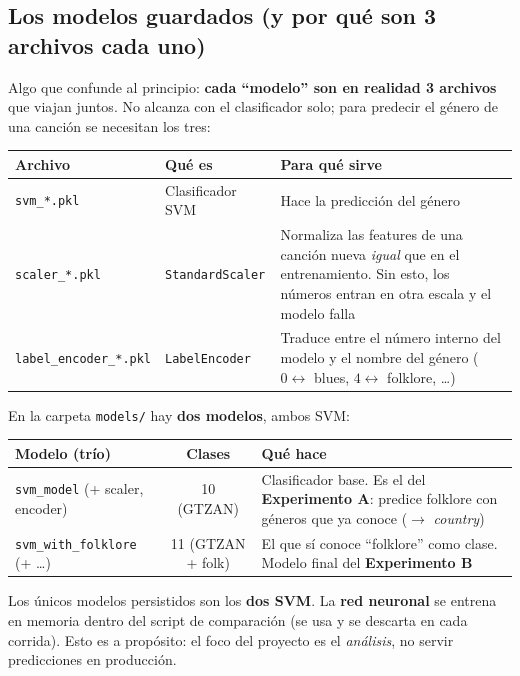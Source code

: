 \documentclass[11pt,a4paper]{article}
\newenvironment{defenbox}[1]{\begin{mdframed}[style=defenstyle,frametitle={#1}]}{\end{mdframed}}
\begin{document}
\subsection{Los modelos guardados (y por qué son 3 archivos cada uno)}

Algo que confunde al principio: \textbf{cada ``modelo'' son en realidad 3
archivos} que viajan juntos. No alcanza con el clasificador solo; para predecir
el género de una canción se necesitan los tres:

\begin{center}
\begin{tabular}{p{3.2cm} p{3cm} p{7.5cm}}
\toprule
\textbf{Archivo} & \textbf{Qué es} & \textbf{Para qué sirve} \\
\midrule
\texttt{svm\_*.pkl} & Clasificador SVM & Hace la predicción del género \\
\texttt{scaler\_*.pkl} & \texttt{StandardScaler} & Normaliza las features de una canción nueva \emph{igual} que en el entrenamiento. Sin esto, los números entran en otra escala y el modelo falla \\
\texttt{label\_\allowbreak encoder\_*.pkl} & \texttt{LabelEncoder} & Traduce entre el número interno del modelo y el nombre del género ($0 \leftrightarrow$ blues, $4 \leftrightarrow$ folklore, \ldots) \\
\bottomrule
\end{tabular}
\end{center}

En la carpeta \texttt{models/} hay \textbf{dos modelos}, ambos SVM:

\begin{center}
\begin{tabular}{p{4.5cm} c p{7cm}}
\toprule
\textbf{Modelo (trío)} & \textbf{Clases} & \textbf{Qué hace} \\
\midrule
\texttt{svm\_model} (+ scaler, encoder) & 10 (GTZAN) & Clasificador base. Es el del \textbf{Experimento A}: predice folklore con géneros que ya conoce ($\rightarrow$ \emph{country}) \\
\texttt{svm\_with\_folklore} (+ \ldots) & 11 (GTZAN + folk) & El que sí conoce ``folklore'' como clase. Modelo final del \textbf{Experimento B} \\
\bottomrule
\end{tabular}
\end{center}

\begin{defenbox}{La red neuronal no se guarda en disco}
Los únicos modelos persistidos son los \textbf{dos SVM}. La \textbf{red neuronal}
se entrena en memoria dentro del script de comparación (se usa y se descarta en
cada corrida). Esto es a propósito: el foco del proyecto es el \emph{análisis},
no servir predicciones en producción.
\end{defenbox}
\end{document}
